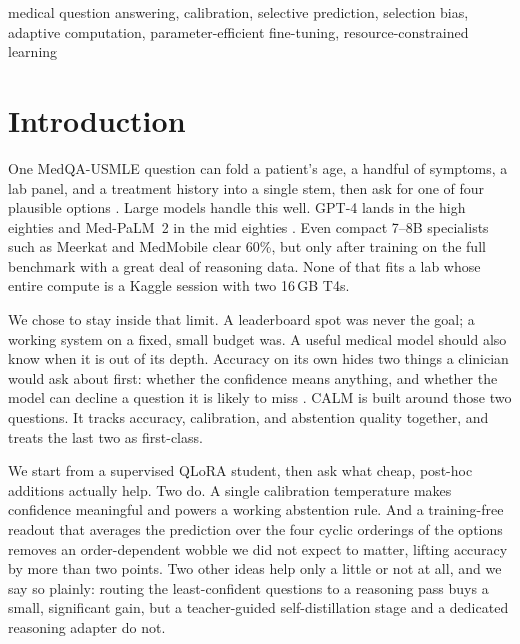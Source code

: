 \documentclass[conference]{IEEEtran}
\begin{document}
\begin{IEEEkeywords}
medical question answering, calibration, selective prediction, selection bias, adaptive computation, parameter-efficient fine-tuning, resource-constrained learning
\end{IEEEkeywords}

\section{Introduction}
One MedQA-USMLE question can fold a patient's age, a handful of symptoms, a lab panel, and a treatment history into a single stem, then ask for one of four plausible options \cite{medqa}. Large models handle this well. GPT-4 lands in the high eighties \cite{gpt4med} and Med-PaLM~2 in the mid eighties \cite{medpalm}. Even compact 7--8B specialists such as Meerkat \cite{meerkat} and MedMobile \cite{medmobile} clear 60\%, but only after training on the full benchmark with a great deal of reasoning data. None of that fits a lab whose entire compute is a Kaggle session with two 16\,GB T4s.

We chose to stay inside that limit. A leaderboard spot was never the goal; a working system on a fixed, small budget was. A useful medical model should also know when it is out of its depth. Accuracy on its own hides two things a clinician would ask about first: whether the confidence means anything, and whether the model can decline a question it is likely to miss \cite{trustsurvey}. CALM is built around those two questions. It tracks accuracy, calibration, and abstention quality together, and treats the last two as first-class.

We start from a supervised QLoRA student, then ask what cheap, post-hoc additions actually help. Two do. A single calibration temperature makes confidence meaningful and powers a working abstention rule. And a training-free readout that averages the prediction over the four cyclic orderings of the options removes an order-dependent wobble we did not expect to matter, lifting accuracy by more than two points. Two other ideas help only a little or not at all, and we say so plainly: routing the least-confident questions to a reasoning pass buys a small, significant gain, but a teacher-guided self-distillation stage and a dedicated reasoning adapter do not.
\end{document}
